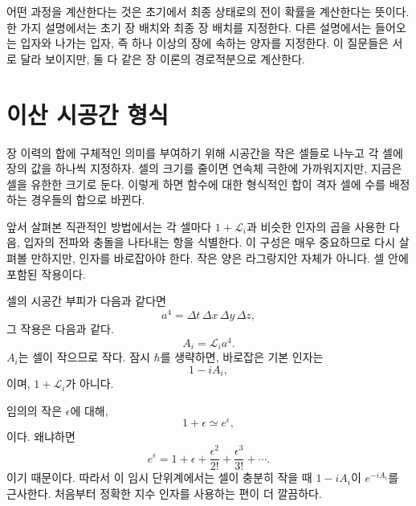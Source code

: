 어떤 과정을 계산한다는 것은 초기에서 최종 상태로의 전이 확률을 계산한다는 뜻이다. 한 가지 설명에서는 초기 장 배치와 최종 장 배치를 지정한다. 다른 설명에서는 들어오는 입자와 나가는 입자, 즉 하나 이상의 장에 속하는 양자를 지정한다. 이 질문들은 서로 달라 보이지만, 둘 다 같은 장 이론의 경로적분으로 계산한다.

\section{이산 시공간 형식}

장 이력의 합에 구체적인 의미를 부여하기 위해 시공간을 작은 셀들로 나누고 각 셀에 장의 값을 하나씩 지정하자. 셀의 크기를 줄이면 연속체 극한에 가까워지지만, 지금은 셀을 유한한 크기로 둔다. 이렇게 하면 함수에 대한 형식적인 합이 격자 셀에 수를 배정하는 경우들의 합으로 바뀐다.

앞서 살펴본 직관적인 방법에서는 각 셀마다 \(1+\mathcal{L}_i\)과 비슷한 인자의 곱을 사용한 다음, 입자의 전파와 충돌을 나타내는 항을 식별한다. 이 구성은 매우 중요하므로 다시 살펴볼 만하지만, 인자를 바로잡아야 한다. 작은 양은 라그랑지안 자체가 아니다. 셀 안에 포함된 작용이다.

셀의 시공간 부피가 다음과 같다면\begin{equation}
a^4=\Delta t\,\Delta x\,\Delta y\,\Delta z,
\end{equation}그 작용은 다음과 같다.\begin{equation}
A_i=\mathcal{L}_i a^4.
\end{equation}\(A_i\)는 셀이 작으므로 작다. 잠시 \(\hbar\)를 생략하면, 바로잡은 기본 인자는\begin{equation}
1-iA_i,
\end{equation}이며, \(1+\mathcal{L}_i\)가 아니다.

임의의 작은 \(\epsilon\)에 대해,\begin{equation}
1+\epsilon\simeq e^\epsilon,
\end{equation}이다. 왜냐하면\begin{equation}
e^\epsilon
=1+\epsilon+\frac{\epsilon^2}{2!}
+\frac{\epsilon^3}{3!}+\cdots.
\end{equation}이기 때문이다. 따라서 이 임시 단위계에서는 셀이 충분히 작을 때 \(1-iA_i\)이 \(e^{-iA_i}\)를 근사한다. 처음부터 정확한 지수 인자를 사용하는 편이 더 깔끔하다.

\begin{classroomqa}
\end{classroomqa}

